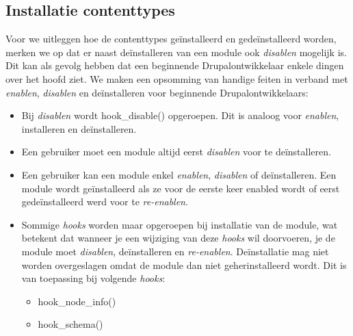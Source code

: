 \subsection{Installatie contenttypes}
Voor we uitleggen hoe de contenttypes ge\"{i}nstalleerd en gede\"{i}nstalleerd worden, merken we op dat er naast de\"{i}nstalleren van een module ook \textit{disablen} mogelijk is. Dit kan als gevolg hebben dat een beginnende Drupalontwikkelaar enkele dingen over het hoofd ziet. We maken een opsomming van handige feiten in verband met \textit{enablen}, \textit{disablen} en de\"{i}nstalleren voor beginnende Drupalontwikkelaars:
\begin{itemize}
\item Bij \textit{disablen} wordt hook\_disable() opgeroepen. Dit is analoog voor \textit{enablen}, installeren en de\"{i}nstalleren.
\item Een gebruiker moet een module altijd eerst \textit{disablen} voor te de\"{i}nstalleren.
\item Een gebruiker kan een module enkel \textit{enablen}, \textit{disablen} of de\"{i}nstalleren. Een module wordt ge\"{i}nstalleerd als ze voor de eerste keer enabled wordt of eerst gede\"{i}nstalleerd werd voor te \textit{re-enablen}.
\item Sommige \textit{hooks} worden maar opgeroepen bij installatie van de module, wat betekent dat wanneer je een wijziging van deze \textit{hooks} wil doorvoeren, je de module moet \textit{disablen}, de\"{i}nstalleren en \textit{re-enablen}. De\"{i}nstallatie mag niet worden overgeslagen omdat de module dan niet geherinstalleerd wordt. Dit is van toepassing bij volgende \textit{hooks}:
\begin{itemize}
\item hook\_node\_info()
\item hook\_schema()
\end{itemize}
\end{itemize}

